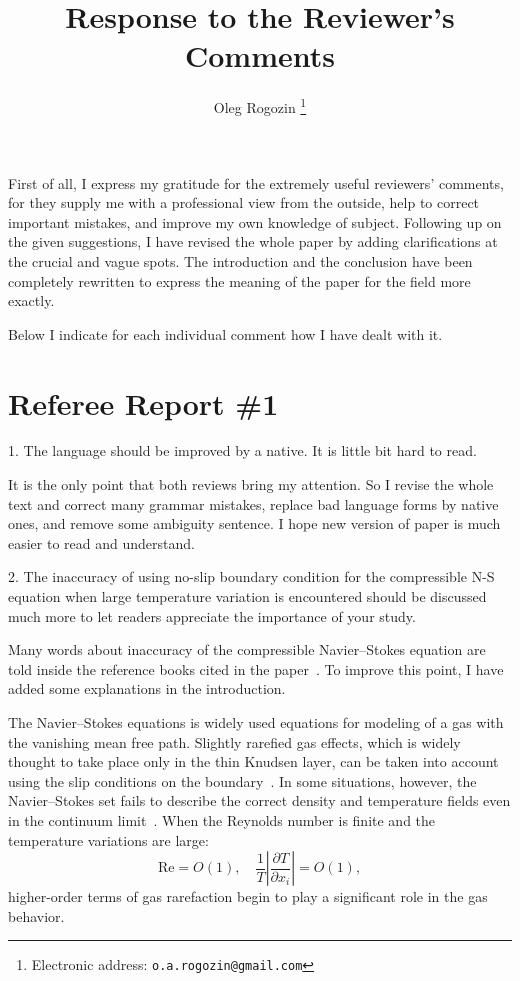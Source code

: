 \documentclass{article}
\title{Response to the Reviewer's Comments}
\author{Oleg Rogozin%
    \thanks{Electronic address: \texttt{o.a.rogozin@gmail.com}}
}
\newcommand{\pder}[2][]{\frac{\partial#1}{\partial#2}}
\begin{document}
\maketitle

First of all, I express my gratitude for the extremely useful reviewers'
comments, for they supply me with a professional view from the outside,
help to correct important mistakes, and improve my own knowledge of
subject. Following up on the given suggestions, I have revised the whole
paper by adding clarifications at the crucial and vague spots. The
introduction and the conclusion have been completely rewritten to express
the meaning of the paper for the field more exactly.  

Below I indicate for each individual comment how I have dealt with it.

\section{Referee Report \#1}

\begin{quoting}
1. The language should be improved by a native. It is little bit hard to
read.
\end{quoting} 

It is the only point that both reviews bring my attention. So I revise
the whole text and correct many grammar mistakes, replace bad language
forms by native ones, and remove some ambiguity sentence. I hope new
version of paper is much easier to read and understand.

\begin{quoting}
2. The inaccuracy of using no-slip boundary condition for the
compressible N-S equation when large temperature variation is
encountered should be discussed much more to let readers appreciate the
importance of your study.
\end{quoting}

Many words about inaccuracy of the compressible Navier--Stokes equation
are told inside the reference books cited in the paper~\cite{Sone2002, Sone2007}.
To improve this point, I have added some explanations in the introduction.

\begin{leftbar}
The Navier--Stokes equations is widely used equations for modeling of a
gas with the vanishing mean free path. Slightly rarefied gas effects,
which is widely thought to take place only in the thin Knudsen layer,
can be taken into account using the slip conditions on the
boundary~\cite{SharipovCoefficients}. In some situations, however, the
Navier--Stokes set fails to describe the correct density and temperature
fields even in the continuum limit~\cite{Kogan1976, GhostEffect}. When
the Reynolds number is finite and the temperature variations are large:
\[ \mathrm{Re} = O(1), \quad \frac1T\left|\pder[T]{x_i}\right| = O(1), \]
higher-order terms of gas rarefaction begin to play a significant
role in the gas behavior.
\end{leftbar}
\end{document}
